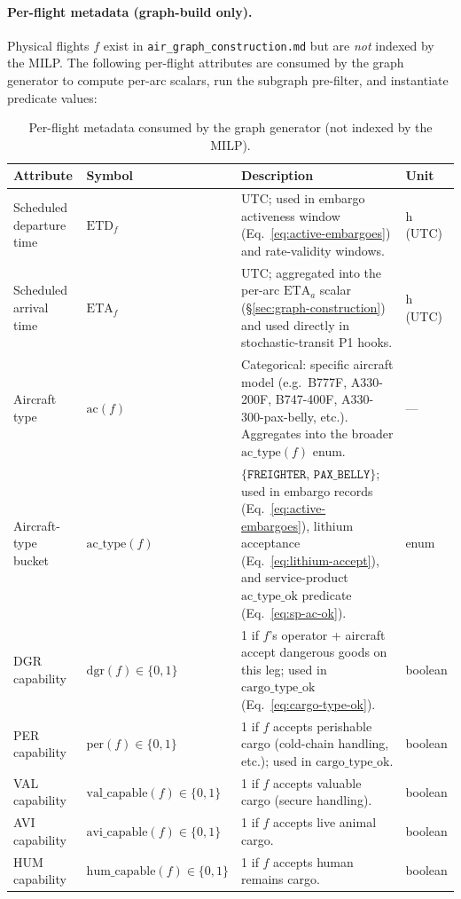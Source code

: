 \documentclass[11pt,a4paper]{article}
\theoremstyle{definition}
\begin{document}
\paragraph{Per-flight metadata (graph-build only).}
Physical flights $f$ exist in \texttt{air\_graph\_construction.md} but are
\emph{not} indexed by the MILP. The following per-flight attributes are
consumed by the graph generator to compute per-arc scalars, run the
subgraph pre-filter, and instantiate predicate values:
\begin{table}[H]
\centering
\caption{Per-flight metadata consumed by the graph generator (not indexed by the MILP).}
\label{tab:flight-metadata}
\begin{tabular}{p{2.8cm}p{2.5cm}p{7cm}p{1.5cm}}
\toprule
Attribute & Symbol & Description & Unit \\
\midrule
Scheduled departure time & $\text{ETD}_f$ & UTC; used in embargo activeness window (Eq.~\ref{eq:active-embargoes}) and rate-validity windows. & h (UTC) \\
Scheduled arrival time & $\text{ETA}_f$ & UTC; aggregated into the per-arc $\text{ETA}_a$ scalar (\S\ref{sec:graph-construction}) and used directly in stochastic-transit P1 hooks. & h (UTC) \\
Aircraft type & $\text{ac}(f)$ & Categorical: specific aircraft model (e.g.\ B777F, A330-200F, B747-400F, A330-300-pax-belly, etc.). Aggregates into the broader $\text{ac\_type}(f)$ enum. & --- \\
Aircraft-type bucket & $\text{ac\_type}(f)$ & $\{\texttt{FREIGHTER},\, \texttt{PAX\_BELLY}\}$; used in embargo records (Eq.~\ref{eq:active-embargoes}), lithium acceptance (Eq.~\ref{eq:lithium-accept}), and service-product $\text{ac\_type\_ok}$ predicate (Eq.~\ref{eq:sp-ac-ok}). & enum \\
DGR capability & $\text{dgr}(f) \in \{0, 1\}$ & 1 if $f$'s operator + aircraft accept dangerous goods on this leg; used in $\text{cargo\_type\_ok}$ (Eq.~\ref{eq:cargo-type-ok}). & boolean \\
PER capability & $\text{per}(f) \in \{0, 1\}$ & 1 if $f$ accepts perishable cargo (cold-chain handling, etc.); used in $\text{cargo\_type\_ok}$. & boolean \\
VAL capability & $\text{val\_capable}(f) \in \{0, 1\}$ & 1 if $f$ accepts valuable cargo (secure handling). & boolean \\
AVI capability & $\text{avi\_capable}(f) \in \{0, 1\}$ & 1 if $f$ accepts live animal cargo. & boolean \\
HUM capability & $\text{hum\_capable}(f) \in \{0, 1\}$ & 1 if $f$ accepts human remains cargo. & boolean \\

\end{tabular}
\end{table}
\end{document}
